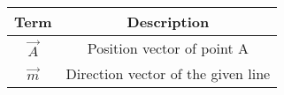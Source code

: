 \begin{tabular}[12ptx]{ |c| c|}
\hline\textbf{Term} & \textbf{Description}\\
\hline
$\vec{A}$&Position vector of point A \\
\hline
$\vec{m}$&Direction vector of the given line \\
\hline
\end{tabular}
